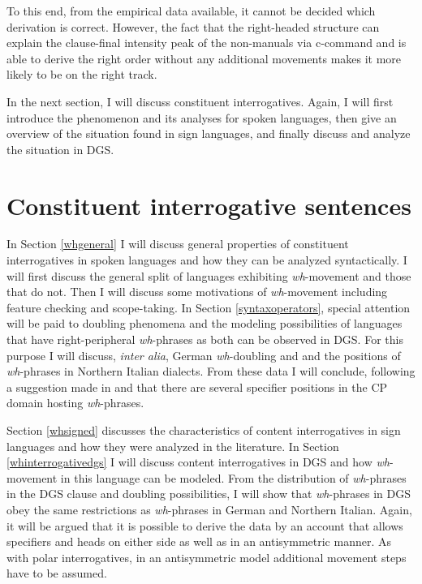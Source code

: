 \noindent To this end, from the empirical data available, it cannot be decided which derivation is correct. However, the fact that the right-headed structure can explain the clause-final intensity peak of the non-manuals via c-command and is able to derive the right order without any additional movements makes it more likely to be on the right track. %

In the next section, I will discuss constituent interrogatives. Again, I will first introduce the phenomenon and its analyses for spoken languages, then give an overview of the situation found in sign languages, and finally discuss and analyze the situation in DGS.



\section{Constituent interrogative sentences}\label{constint}

In Section \ref{whgeneral} I will discuss general properties of constituent interrogatives in spoken languages and how they can be analyzed syntactically. I will first discuss the general split of languages exhibiting \textit{wh}-movement and those that do not. Then I will discuss some motivations of \textit{wh}-movement including feature checking and scope-taking. In Section \ref{syntaxoperators}, special attention will be paid to doubling phenomena and the modeling possibilities of languages that have right-peripheral \textit{wh}-phrases as both can be observed in DGS. For this purpose I will discuss, \textit{inter alia}, German \textit{wh}-doubling and and the positions of \textit{wh}-phrases in Northern Italian dialects. From these data I will conclude, following a suggestion made in \citet{aboh2010sa} and \citet{van2010complex, van2012you} that there are several specifier positions in the CP domain hosting \textit{wh}-phrases. 

Section \ref{whsigned} discusses the characteristics of content interrogatives in sign languages and how they were analyzed in the literature. In Section \ref{whinterrogativedgs} I will discuss content interrogatives in DGS and how \textit{wh}-movement in this language can be modeled. From the distribution of \textit{wh}-phrases in the DGS clause and doubling possibilities, I will show  that \textit{wh}-phrases in DGS obey the same restrictions as \textit{wh}-phrases in German and Northern Italian. Again, it will be argued that it is possible to derive the data by an account that allows specifiers and heads on either side as well as in an antisymmetric manner. As with polar interrogatives, in an antisymmetric model additional movement steps have to be assumed. 


